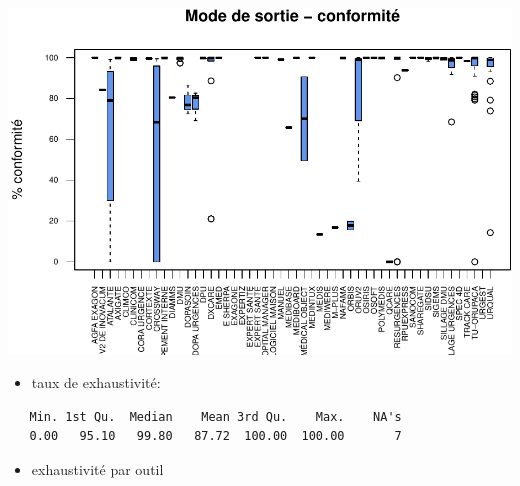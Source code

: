 \documentclass[]{article}
\begin{document}
\includegraphics{septembre2015_files/figure-latex/unnamed-chunk-22-1.pdf}

\begin{itemize}
\itemsep1pt\parskip0pt
\item
  taux de exhaustivité:
\end{itemize}

\begin{verbatim}
   Min. 1st Qu.  Median    Mean 3rd Qu.    Max.    NA's 
   0.00   95.10   99.80   87.72  100.00  100.00       7 
\end{verbatim}

\begin{itemize}
\itemsep1pt\parskip0pt
\item
  exhaustivité par outil
\end{itemize}
\end{document}
